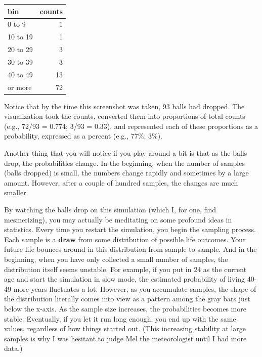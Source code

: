 \documentclass[
  openany]{book}
\begin{document}
\begin{table}[!h]
\centering
\begin{tabular}{lr}
\toprule
bin & counts\\
\midrule
0 to 9 & 1\\
10 to 19 & 1\\
20 to 29 & 3\\
30 to 39 & 3\\
40 to 49 & 13\\
\addlinespace
50 or more & 72\\
\bottomrule
\end{tabular}
\end{table}

Notice that by the time this screenshot was taken, 93 balls had dropped. The visualization took the counts, converted them into proportions of total counts (e.g., 72/93 = 0.774; 3/93 = 0.33), and represented each of these proportions as a probability, expressed as a percent (e.g., 77\%; 3\%).

Another thing that you will notice if you play around a bit is that as the balls drop, the probabilities change. In the beginning, when the number of samples (balls dropped) is small, the numbers change rapidly and sometimes by a large amount. However, after a couple of hundred samples, the changes are much smaller.

By watching the balls drop on this simulation (which I, for one, find mesmerizing), you may actually be meditating on some profound ideas in statistics. Every time you restart the simulation, you begin the sampling process. Each sample is a \textbf{draw} from some distribution of possible life outcomes. Your future life bounces around in this distribution from sample to sample. And in the beginning, when you have only collected a small number of samples, the distribution itself seems unstable. For example, if you put in 24 as the current age and start the simulation in slow mode, the estimated probability of living 40-49 more years fluctuates a lot. However, as you accumulate samples, the shape of the distribution literally comes into view as a pattern among the gray bars just below the x-axis. As the sample size increases, the probabilities becomes more stable. Eventually, if you let it run long enough, you end up with the same values, regardless of how things started out. (This increasing stability at large samples is why I was hesitant to judge Mel the meteorologist until I had more data.)
\end{document}
